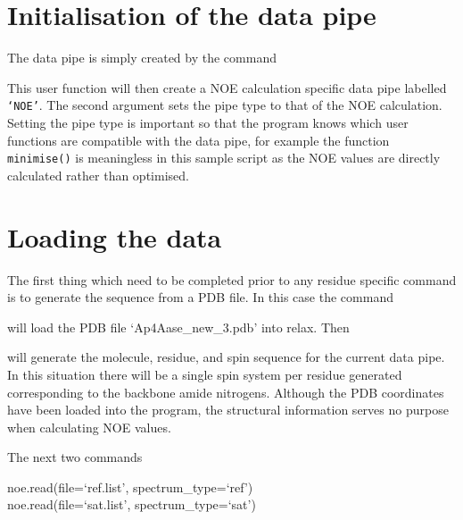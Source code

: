 
\section{Initialisation of the data pipe} \label{NOE initialisation}

The data pipe is simply created by the command


This user function will then create a NOE calculation specific data pipe labelled \texttt{`NOE'}.  The second argument sets the pipe type to that of the NOE calculation.  Setting the pipe type is important so that the program knows which user functions are compatible with the data pipe, for example the function \texttt{minimise()} is meaningless in this sample script as the NOE values are directly calculated rather than optimised.




\section{Loading the data}

The first thing which need to be completed prior to any residue specific command is to generate the sequence from a PDB file.  In this case the command


will load the PDB file `Ap4Aase\_new\_3.pdb' into relax.  Then


will generate the molecule, residue, and spin sequence for the current data pipe.  In this situation there will be a single spin system per residue generated corresponding to the backbone amide nitrogens.  Although the PDB coordinates have been loaded into the program, the structural information serves no purpose when calculating NOE values.

The next two commands

\begin{exampleenv}
noe.read(file=`ref.list', spectrum\_type=`ref') \\
noe.read(file=`sat.list', spectrum\_type=`sat')
\end{exampleenv}

